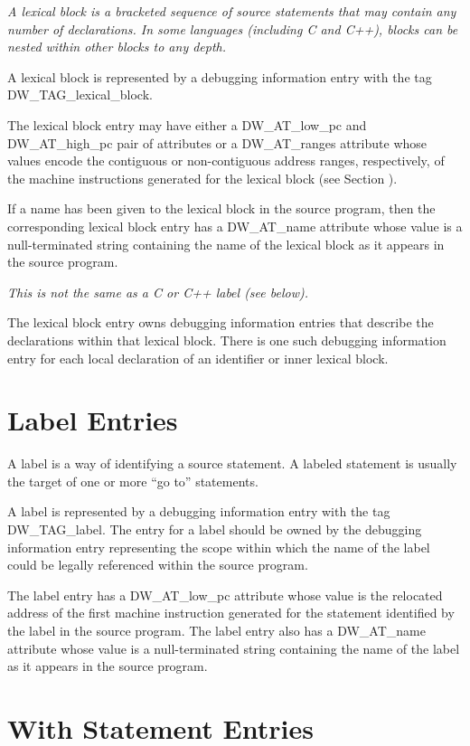 \textit{A lexical block is a bracketed sequence of source statements
that may contain any number of declarations. In some languages
(including C and C++), blocks can be nested within other
blocks to any depth.}

A lexical block is represented by a debugging information
entry with the tag DW\-\_TAG\-\_lexical\-\_block.

The lexical block entry may have either a DW\_AT\_low\_pc and
DW\_AT\_high\_pc pair of attributes or a DW\_AT\_ranges attribute
whose values encode the contiguous or non-contiguous address
ranges, respectively, of the machine instructions generated
for the lexical block 
(see Section ).

If a name has been given to the lexical block in the source
program, then the corresponding lexical block entry has a
DW\_AT\_name attribute whose value is a null-terminated string
containing the name of the lexical block as it appears in
the source program.

\textit{This is not the same as a C or C++ label (see below).}

The lexical block entry owns debugging information entries that
describe the declarations within that lexical block. There is
one such debugging information entry for each local declaration
of an identifier or inner lexical block.

\section{Label Entries}
\label{chap:labelentries}

A label is a way of identifying a source statement. A labeled
statement is usually the target of one or more ``go to''
statements.

A label is represented by a debugging information entry with
the tag DW\_TAG\_label. The entry for a label should be owned by
the debugging information entry representing the scope within
which the name of the label could be legally referenced within
the source program.

The label entry has a DW\_AT\_low\_pc attribute whose value
is the relocated address of the first machine instruction
generated for the statement identified by the label in
the source program.  The label entry also has a DW\_AT\_name
attribute whose value is a null-terminated string containing
the name of the label as it appears in the source program.


\section{With Statement Entries}
\label{chap:withstatemententries}


